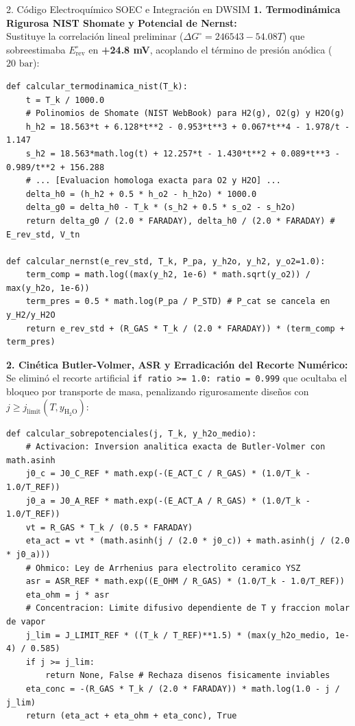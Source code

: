 \documentclass[12pt]{article}
\begin{document}
\begin{minipage}[t]{0.49\linewidth}
    \vspace{0.18cm}

    \begin{posterbox}[secondaryblue]{2. Código Electroquímico SOEC e Integración en DWSIM}
        \fontsize{15.5}{19.5}\selectfont
        \textbf{1. Termodinámica Rigurosa NIST Shomate y Potencial de Nernst:}\\
        Sustituye la correlación lineal preliminar ($\Delta G^\circ = 246543 - 54.08T$) que sobreestimaba $E^\circ_{\text{rev}}$ en \textbf{+24.8 mV}, acoplando el término de presión anódica ($20\text{ bar}$):
\begin{lstlisting}
def calcular_termodinamica_nist(T_k):
    t = T_k / 1000.0
    # Polinomios de Shomate (NIST WebBook) para H2(g), O2(g) y H2O(g)
    h_h2 = 18.563*t + 6.128*t**2 - 0.953*t**3 + 0.067*t**4 - 1.978/t - 1.147
    s_h2 = 18.563*math.log(t) + 12.257*t - 1.430*t**2 + 0.089*t**3 - 0.989/t**2 + 156.288
    # ... [Evaluacion homologa exacta para O2 y H2O] ...
    delta_h0 = (h_h2 + 0.5 * h_o2 - h_h2o) * 1000.0
    delta_g0 = delta_h0 - T_k * (s_h2 + 0.5 * s_o2 - s_h2o)
    return delta_g0 / (2.0 * FARADAY), delta_h0 / (2.0 * FARADAY) # E_rev_std, V_tn

def calcular_nernst(e_rev_std, T_k, P_pa, y_h2o, y_h2, y_o2=1.0):
    term_comp = math.log((max(y_h2, 1e-6) * math.sqrt(y_o2)) / max(y_h2o, 1e-6))
    term_pres = 0.5 * math.log(P_pa / P_STD) # P_cat se cancela en y_H2/y_H2O
    return e_rev_std + (R_GAS * T_k / (2.0 * FARADAY)) * (term_comp + term_pres)
\end{lstlisting}

        \textbf{2. Cinética Butler-Volmer, ASR y Erradicación del Recorte Numérico:}\\
        Se eliminó el recorte artificial \texttt{if ratio >= 1.0: ratio = 0.999} que ocultaba el bloqueo por transporte de masa, penalizando rigurosamente diseños con $j \ge j_{\text{limit}}(T, y_{\text{H}_2\text{O}})$:
\begin{lstlisting}
def calcular_sobrepotenciales(j, T_k, y_h2o_medio):
    # Activacion: Inversion analitica exacta de Butler-Volmer con math.asinh
    j0_c = J0_C_REF * math.exp(-(E_ACT_C / R_GAS) * (1.0/T_k - 1.0/T_REF))
    j0_a = J0_A_REF * math.exp(-(E_ACT_A / R_GAS) * (1.0/T_k - 1.0/T_REF))
    vt = R_GAS * T_k / (0.5 * FARADAY)
    eta_act = vt * (math.asinh(j / (2.0 * j0_c)) + math.asinh(j / (2.0 * j0_a)))
    # Ohmico: Ley de Arrhenius para electrolito ceramico YSZ
    asr = ASR_REF * math.exp((E_OHM / R_GAS) * (1.0/T_k - 1.0/T_REF))
    eta_ohm = j * asr
    # Concentracion: Limite difusivo dependiente de T y fraccion molar de vapor
    j_lim = J_LIMIT_REF * ((T_k / T_REF)**1.5) * (max(y_h2o_medio, 1e-4) / 0.585)
    if j >= j_lim:
        return None, False # Rechaza disenos fisicamente inviables
    eta_conc = -(R_GAS * T_k / (2.0 * FARADAY)) * math.log(1.0 - j / j_lim)
    return (eta_act + eta_ohm + eta_conc), True
\end{lstlisting}


\end{posterbox}
\end{minipage}
\end{document}
